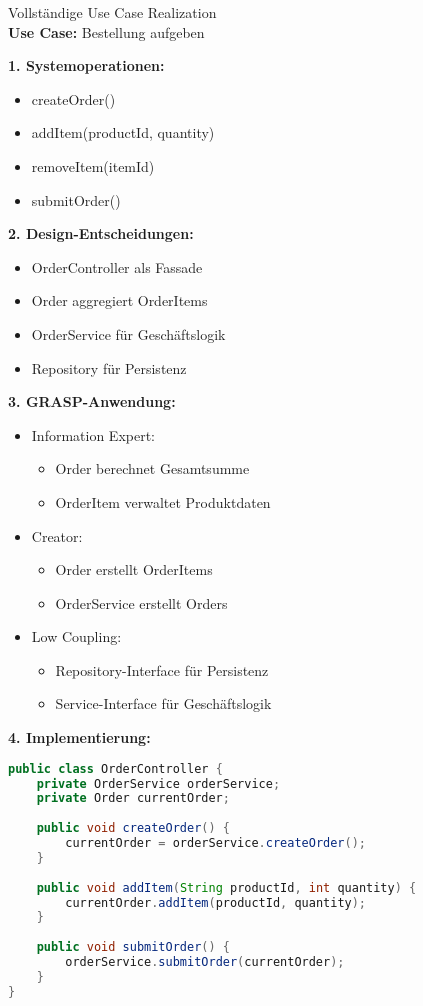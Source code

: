 \begin{example2}{Vollständige Use Case Realization}\\
\textbf{Use Case:} Bestellung aufgeben

\textbf{1. Systemoperationen:}
\begin{itemize}
    \item createOrder()
    \item addItem(productId, quantity)
    \item removeItem(itemId)
    \item submitOrder()
\end{itemize}

\textbf{2. Design-Entscheidungen:}
\begin{itemize}
    \item OrderController als Fassade
    \item Order aggregiert OrderItems
    \item OrderService für Geschäftslogik
    \item Repository für Persistenz
\end{itemize}

\textbf{3. GRASP-Anwendung:}
\begin{itemize}
    \item Information Expert:
    \begin{itemize}
        \item Order berechnet Gesamtsumme
        \item OrderItem verwaltet Produktdaten
    \end{itemize}
    \item Creator:
    \begin{itemize}
        \item Order erstellt OrderItems
        \item OrderService erstellt Orders
    \end{itemize}
    \item Low Coupling:
    \begin{itemize}
        \item Repository-Interface für Persistenz
        \item Service-Interface für Geschäftslogik
    \end{itemize}
\end{itemize}

\textbf{4. Implementierung:}
\begin{lstlisting}[language=Java, style=basesmol]
public class OrderController {
    private OrderService orderService;
    private Order currentOrder;
    
    public void createOrder() {
        currentOrder = orderService.createOrder();
    }
    
    public void addItem(String productId, int quantity) {
        currentOrder.addItem(productId, quantity);
    }
    
    public void submitOrder() {
        orderService.submitOrder(currentOrder);
    }
}
\end{lstlisting}
\end{example2}



